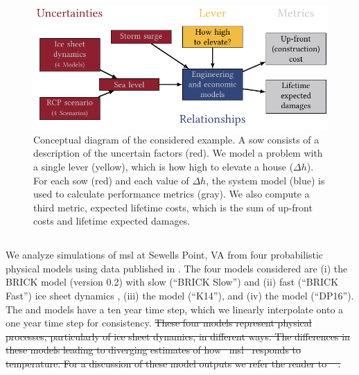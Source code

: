 \documentclass{agujournal2019}
\providecommand{\DIFdel}[1]{{\protect\color{red}\sout{#1}}}                      %
\providecommand{\DIFdelbegin}{} %
\newcommand{\DIFscaledelfig}{0.5}
\newlength{\DIFdelgraphicswidth} %
\newlength{\DIFdelgraphicsheight} %
\newcommand{\DIFdelincludegraphics}[2][]{%
\sbox{\DIFdelgraphicsbox}{\DIFOincludegraphics[#1]{#2}}%
\settoboxwidth{\DIFdelgraphicswidth}{\DIFdelgraphicsbox} %
\settoboxtotalheight{\DIFdelgraphicsheight}{\DIFdelgraphicsbox} %
\scalebox{\DIFscaledelfig}{%
\parbox[b]{\DIFdelgraphicswidth}{\usebox{\DIFdelgraphicsbox}\\[-\baselineskip] \rule{\DIFdelgraphicswidth}{0em}}\llap{\resizebox{\DIFdelgraphicswidth}{\DIFdelgraphicsheight}{%
\setlength{\unitlength}{\DIFdelgraphicswidth}%
\begin{picture}(1,1)%
\thicklines\linethickness{2pt} %
{\color[rgb]{1,0,0}\put(0,0){\framebox(1,1){}}}%
{\color[rgb]{1,0,0}\put(0,0){\line( 1,1){1}}}%
{\color[rgb]{1,0,0}\put(0,1){\line(1,-1){1}}}%
\end{picture}%
}\hspace*{3pt}}} %
} %
\DeclareRobustCommand{\DIFdelbegin}{\DIFOdelbegin \let\includegraphics\DIFdelincludegraphics} %
\begin{document}
\begin{figure}
  \centering
  \includegraphics[width=\textwidth]{xlrm.pdf}
  \caption{
    Conceptual diagram of the considered example.
    A \acrfull{sow} consists of a description of the uncertain factors (red).
    We model a problem with a single lever (yellow), which is how high to elevate a house ($\Delta h$).
    For each \acrshort{sow} (red) and each value of $\Delta h$, the system model (blue) is used to calculate performance metrics (gray).
    We also compute a third metric, expected lifetime costs, which is the sum of up-front costs and lifetime expected damages.
  }\label{fig:xlrm}
\end{figure}

\subsection{}\label{sec:case-slr}

We analyze simulations of \gls{msl} at Sewells Point, VA from four probabilistic physical models using data published in .
The four models considered are (i) the BRICK model (version 0.2) with slow (``BRICK Slow'') and (ii) fast (``BRICK Fast'') ice sheet dynamics \cite{wong_brick0.2:2017}, (iii) the  model (``K14''), and (iv) the  model (``DP16'').
The  and  models have a ten year time step, which we linearly interpolate onto a one year time step for consistency.
\DIFdelbegin \DIFdel{These four models represent physical processes, particularly of ice sheet dynamics, in different ways.
The differences in these models leading to diverging estimates of how \mbox{%
\gls{msl} }\hskip0pt%
responds to temperature.
For a discussion of these model outputs we refer the reader to \mbox{%
\citeA{ruckert_coastal:2019}}\hskip0pt%
.
}%
\end{document}
